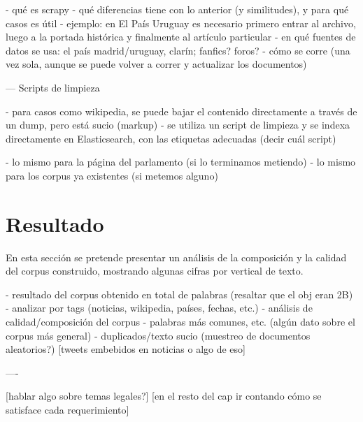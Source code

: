 - qué es scrapy
- qué diferencias tiene con lo anterior (y similitudes), y para qué casos es útil
    - ejemplo: en El País Uruguay es necesario primero entrar al archivo, luego a la portada
      histórica y finalmente al artículo particular
- en qué fuentes de datos se usa: el país madrid/uruguay, clarín; fanfics? foros?
- cómo se corre (una vez sola, aunque se puede volver a correr y actualizar los documentos)


--- Scripts de limpieza

- para casos como wikipedia, se puede bajar el contenido directamente a través de un dump, pero está
  sucio (markup)
- se utiliza un script de limpieza y se indexa directamente en Elasticsearch, con las etiquetas
  adecuadas (decir cuál script)

- lo mismo para la página del parlamento (si lo terminamos metiendo)
- lo mismo para los corpus ya existentes (si metemos alguno)


\section{Resultado}

En esta sección se pretende presentar un análisis de la composición y la calidad del corpus
construido, mostrando algunas cifras por vertical de texto.


- resultado del corpus obtenido en total de palabras (resaltar que el obj eran 2B)
- analizar por tags (noticias, wikipedia, países, fechas, etc.)
- análisis de calidad/composición del corpus
    - palabras más comunes, etc. (algún dato sobre el corpus más general)
    - duplicados/texto sucio (muestreo de documentos aleatorios?)
    [tweets embebidos en noticias o algo de eso]


----

[hablar algo sobre temas legales?]
[en el resto del cap ir contando cómo se satisface cada requerimiento]